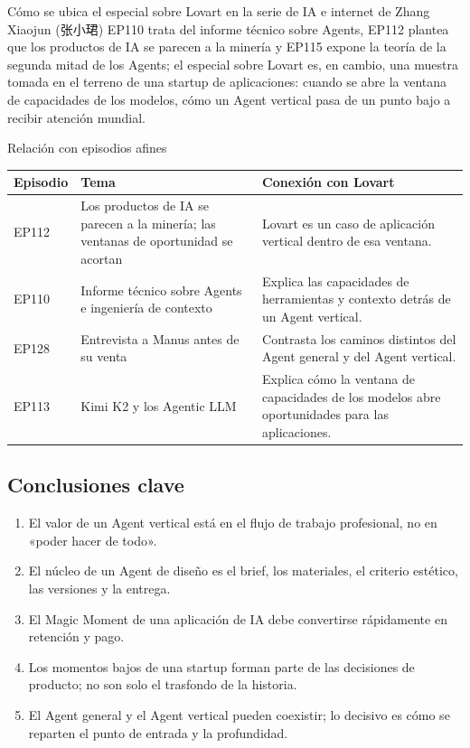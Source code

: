 \documentclass[a4paper]{article}
\begin{document}
\begin{importantbox}{Cómo se ubica el especial sobre Lovart en la serie de IA e internet de Zhang Xiaojun (张小珺)}
EP110 trata del informe técnico sobre Agents, EP112 plantea que los productos de IA se parecen a la minería y EP115 expone la teoría de la segunda mitad de los Agents; el especial sobre Lovart es, en cambio, una muestra tomada en el terreno de una startup de aplicaciones: cuando se abre la ventana de capacidades de los modelos, cómo un Agent vertical pasa de un punto bajo a recibir atención mundial.
\end{importantbox}

\begin{knowledgebox}{Relación con episodios afines}
\begin{tabularx}{\textwidth}{p{}p{}X}
\toprule
Episodio & Tema & Conexión con Lovart \\
\midrule
EP112 & Los productos de IA se parecen a la minería; las ventanas de oportunidad se acortan & Lovart es un caso de aplicación vertical dentro de esa ventana. \\
EP110 & Informe técnico sobre Agents e ingeniería de contexto & Explica las capacidades de herramientas y contexto detrás de un Agent vertical. \\
EP128 & Entrevista a Manus antes de su venta & Contrasta los caminos distintos del Agent general y del Agent vertical. \\
EP113 & Kimi K2 y los Agentic LLM & Explica cómo la ventana de capacidades de los modelos abre oportunidades para las aplicaciones. \\
\bottomrule
\end{tabularx}
\end{knowledgebox}

\subsection{Conclusiones clave}

\begin{enumerate}
\item El valor de un Agent vertical está en el flujo de trabajo profesional, no en «poder hacer de todo».
\item El núcleo de un Agent de diseño es el brief, los materiales, el criterio estético, las versiones y la entrega.
\item El Magic Moment de una aplicación de IA debe convertirse rápidamente en retención y pago.
\item Los momentos bajos de una startup forman parte de las decisiones de producto; no son solo el trasfondo de la historia.
\item El Agent general y el Agent vertical pueden coexistir; lo decisivo es cómo se reparten el punto de entrada y la profundidad.
\end{enumerate}
\end{document}
